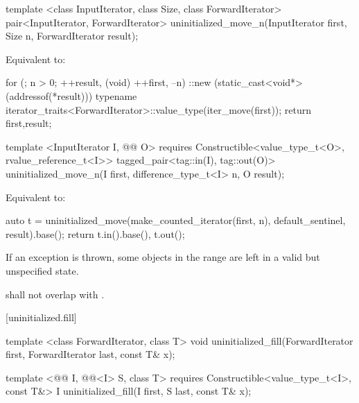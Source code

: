 {\color{remclr}
\begin{codeblock}
template <class InputIterator, class Size, class ForwardIterator>
  pair<InputIterator, ForwardIterator>
    uninitialized_move_n(InputIterator first, Size n, ForwardIterator result);
\end{codeblock}

\setcounter{Paras}{2}
\pnum
\effects Equivalent to:
\begin{codeblock}
        for (; n > 0; ++result, (void) ++first, --n)
          ::new (static_cast<void*>(addressof(*result)))
            typename iterator_traits<ForwardIterator>::value_type(iter_move(first));
        return {first,result};
\end{codeblock}
} %

{\color{addclr}
\begin{codeblock}
template <InputIterator I, @@ O>
requires
  Constructible<value_type_t<O>, rvalue_reference_t<I>>
tagged_pair<tag::in(I), tag::out(O)>
  uninitialized_move_n(I first, difference_type_t<I> n, O result);
\end{codeblock}

\pnum
\effects Equivalent to:
\begin{codeblock}
    auto t = uninitialized_move(make_counted_iterator(first, n),
                                default_sentinel{}, result).base();
    return {t.in().base(), t.out()};
\end{codeblock}
} %

\setcounter{Paras}{3}
\pnum
\remarks If an exception is thrown, some objects in the range  are left
in a valid\added{,} but unspecified state.

{\color{addclr}
\setcounter{Paras}{5}
\pnum
\requires {} shall not overlap with .

} %

[uninitialized.fill]{}
{\color{remclr}
\begin{codeblock}
template <class ForwardIterator, class T>
  void uninitialized_fill(ForwardIterator first, ForwardIterator last,
                          const T& x);
\end{codeblock}
} %

{\color{addclr}
\begin{codeblock}
template <@@ I, @@<I> S, class T>
requires
  Constructible<value_type_t<I>, const T&>
I uninitialized_fill(I first, S last, const T& x);
\end{codeblock}
} %

